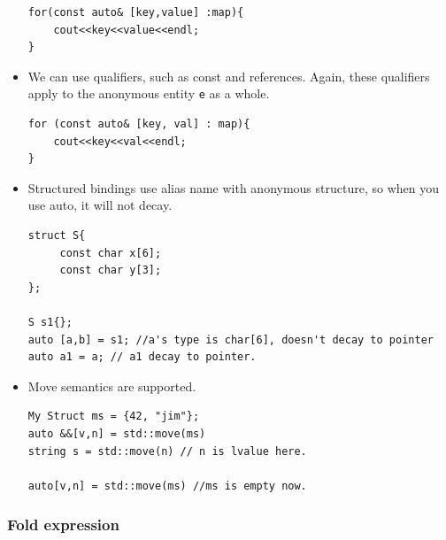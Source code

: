 \documentclass[a4paper,11pt,twoside]{book}
\begin{document}
\begin{itemize}
\begin{lstlisting}
for(const auto& [key,value] :map){
	cout<<key<<value<<endl;
}
\end{lstlisting}
	
	
	
    \item We can use qualifiers, such as const and references. Again, these qualifiers apply to the anonymous entity \texttt{e} as a whole.

\begin{lstlisting}
for (const auto& [key, val] : map){
	cout<<key<<val<<endl;
}
\end{lstlisting}	

    \item Structured bindings use alias name with anonymous structure, so when you use auto, it will not decay.

\begin{lstlisting}
struct S{
	 const char x[6];
	 const char y[3];
};

S s1{};
auto [a,b] = s1; //a's type is char[6], doesn't decay to pointer
auto a1 = a; // a1 decay to pointer. 
\end{lstlisting}	

    \item Move semantics are supported.

\begin{lstlisting}
My Struct ms = {42, "jim"};
auto &&[v,n] = std::move(ms)
string s = std::move(n) // n is lvalue here.

auto[v,n] = std::move(ms) //ms is empty now.
\end{lstlisting}	

\end{itemize}

\subsubsection{Fold expression}
\end{document}
